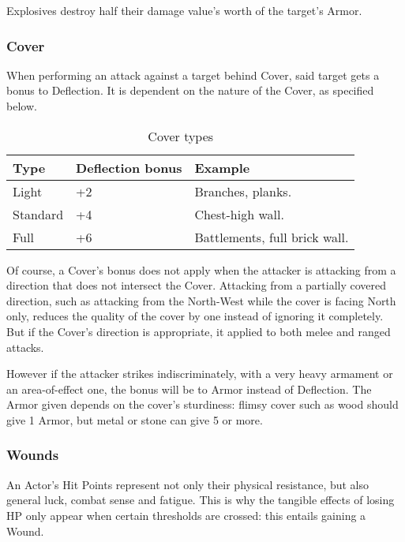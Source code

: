 Explosives destroy half their damage value's worth of the target's Armor.

\subsubsection{Cover}

When performing an attack against a target behind Cover, said target gets a bonus to Deflection. It is dependent on the nature of the Cover, as specified below.

\begin{table}[h!tbp]
	\begin{center}
		\begin{tabular}{p{1.5cm}p{2cm}p{4cm}} \toprule
			
			\textbf{Type} & \textbf{Deflection bonus} & \textbf{Example} \\ \midrule
			
			Light & +2 & Branches, planks. \\
			Standard & +4 & Chest-high wall. \\
			Full & +6 & Battlements, full brick wall.\\

			\bottomrule
		\end{tabular}
	\end{center}
	\caption{Cover types}
	\label{cover_types}
\end{table}

Of course, a Cover's bonus does not apply when the attacker is attacking from a direction that does not intersect the Cover. Attacking from a partially covered direction, such as attacking from the North-West while the cover is facing North only, reduces the quality of the cover by one instead of ignoring it completely. But if the Cover's direction is appropriate, it applied to both melee and ranged attacks. 

However if the attacker strikes indiscriminately, with a very heavy armament or an area-of-effect one, the bonus will be to Armor instead of Deflection. The Armor given depends on the cover's sturdiness: flimsy cover such as wood should give 1 Armor, but metal or stone can give 5 or more. 

\subsubsection{Wounds}
\label{wounds}

An Actor's Hit Points represent not only their physical resistance, but also general luck, combat sense and fatigue. This is why the tangible effects of losing HP only appear when certain thresholds are crossed: this entails gaining a Wound.


